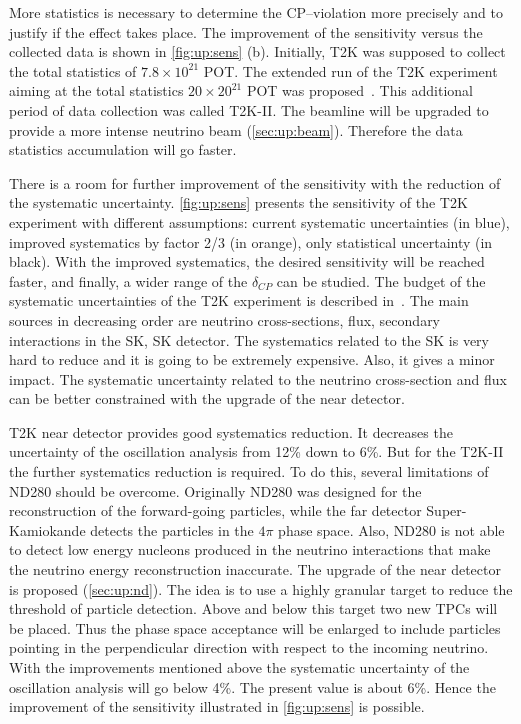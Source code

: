 \documentclass[main.tex]{subfiles}
\begin{document}
More statistics is necessary to determine the CP--violation more precisely and to justify if the effect takes place. The improvement of the sensitivity versus the collected data is shown in \autoref{fig:up:sens} (b). Initially, T2K was supposed to collect the total statistics of $7.8\times10^{21}$ POT. The extended run of the T2K experiment aiming at the total statistics $20\times20^{21}$ POT was proposed~\cite{Abe2016e}. This additional period of data collection was called T2K-II. The beamline will be upgraded to provide a more intense neutrino beam (\autoref{sec:up:beam}). Therefore the data statistics accumulation will go faster.

There is a room for further improvement of the sensitivity with the reduction of the systematic uncertainty. \autoref{fig:up:sens} presents the sensitivity of the T2K experiment with different assumptions: current systematic uncertainties (in blue), improved systematics by factor 2/3 (in orange), only statistical uncertainty (in black). With the improved systematics, the desired sensitivity will be reached faster, and finally, a wider range of the $\delta_{CP}$ can be studied. The budget of the systematic uncertainties of the T2K experiment is described in~\cite{Abe2017}. The main sources in decreasing order are neutrino cross-sections, flux, secondary interactions in the SK, SK detector. The systematics related to the SK is very hard to reduce and it is going to be extremely expensive. Also, it gives a minor impact. The systematic uncertainty related to the neutrino cross-section and flux can be better constrained with the upgrade of the near detector.

T2K near detector provides good systematics reduction. It decreases the uncertainty of the oscillation analysis from 12\% down to 6\%. But for the T2K-II the further systematics reduction is required. To do this, several limitations of ND280 should be overcome. Originally ND280 was designed for the reconstruction of the forward-going particles, while the far detector Super-Kamiokande detects the particles in the $4\pi$ phase space. Also, ND280 is not able to detect low energy nucleons produced in the neutrino interactions that make the neutrino energy reconstruction inaccurate. The upgrade of the near detector is proposed (\autoref{sec:up:nd}). The idea is to use a highly granular target to reduce the threshold of particle detection. Above and below this target two new TPCs will be placed. Thus the phase space acceptance will be enlarged to include particles pointing in the perpendicular direction with respect to the incoming neutrino. With the improvements mentioned above the systematic uncertainty of the oscillation analysis will go below 4\%. The present value is about 6\%. Hence the improvement of the sensitivity illustrated in \autoref{fig:up:sens} is possible.
\end{document}
